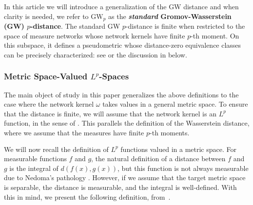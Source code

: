 \documentclass[twoside,11pt]{article}
\theoremstyle{definition}
\newcommand{\dgw}{\mathrm{GW}_p}
\newcommand{\define}[1]{\textbf{#1}}
\begin{document}
In this article we will introduce a generalization of the GW distance and when clarity is needed, we refer to $\dgw$ as the \define{\emph{standard} Gromov-Wasserstein (GW) $p$-distance}. The standard GW $p$-distance is finite when restricted to the space of measure networks whose network kernels have finite $p$-th moment. On this subspace, it defines a pseudometric whose distance-zero equivalence classes can be precisely characterized: see \citep[Theorem 2.4]{chowdhury2019gromov} or the discussion in  below.

\subsubsection{Metric Space-Valued \texorpdfstring{$L^p$}{Lp}-Spaces}\label{sec:metric_space_valued_Lp}

The main object of study in this paper generalizes the above definitions to the case where the network kernel $\omega$ takes values in a general metric space. To ensure that the distance is finite, we will assume that the network kernel is an $L^p$ function, in the sense of \citet[Section 1.1]{Korevaar1993SobolevSA}. This parallels the definition of the Wasserstein distance, where we assume that the measures have finite $p$-th moments. 

We will now recall the definition of $L^p$ functions valued in a metric space. For measurable functions $f$ and $g$, the natural definition of a distance between $f$ and $g$ is the integral of $d(f(x),g(x))$, but this function is not always measurable due to Nedoma's pathology \citep[Section 15.9]{SchillingKuhn2021}. However, if we assume that the target metric space is separable, the distance is measurable, and the integral is well-defined. With this in mind, we present the following definition, from~\citet[Section 1.1]{Korevaar1993SobolevSA}.
\end{document}
